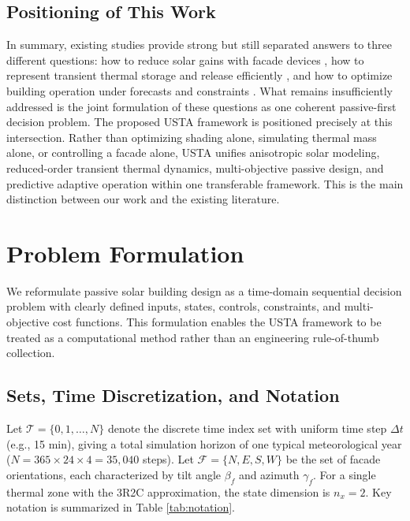 \documentclass[5p,times,twocolumn]{elsarticle}
\begin{document}
\subsection{Positioning of This Work}

In summary, existing studies provide strong but still separated answers to three different questions: how to reduce solar gains with facade devices \cite{kirimtat2016,perez1990,valladares2014,nazari2023}, how to represent transient thermal storage and release efficiently \cite{verbeke2018,yang2024,lauster2014}, and how to optimize building operation under forecasts and constraints \cite{drgona2020,zhan2021,goncalves2024}. What remains insufficiently addressed is the joint formulation of these questions as one coherent passive-first decision problem. The proposed USTA framework is positioned precisely at this intersection. Rather than optimizing shading alone, simulating thermal mass alone, or controlling a facade alone, USTA unifies anisotropic solar modeling, reduced-order transient thermal dynamics, multi-objective passive design, and predictive adaptive operation within one transferable framework. This is the main distinction between our work and the existing literature.

\section{Problem Formulation}
\label{sec:formulation}

We reformulate passive solar building design as a time-domain sequential decision problem with clearly defined inputs, states, controls, constraints, and multi-objective cost functions. This formulation enables the USTA framework to be treated as a computational method rather than an engineering rule-of-thumb collection.

\subsection{Sets, Time Discretization, and Notation}

Let $\mathcal{T} = \{0, 1, \ldots, N\}$ denote the discrete time index set with uniform time step $\Delta t$ (e.g., 15 min), giving a total simulation horizon of one typical meteorological year ($N = 365 \times 24 \times 4 = 35,040$ steps). Let $\mathcal{F} = \{N, E, S, W\}$ be the set of facade orientations, each characterized by tilt angle $\beta_f$ and azimuth $\gamma_f$. For a single thermal zone with the 3R2C approximation, the state dimension is $n_x = 2$. Key notation is summarized in Table \ref{tab:notation}.
\end{document}
